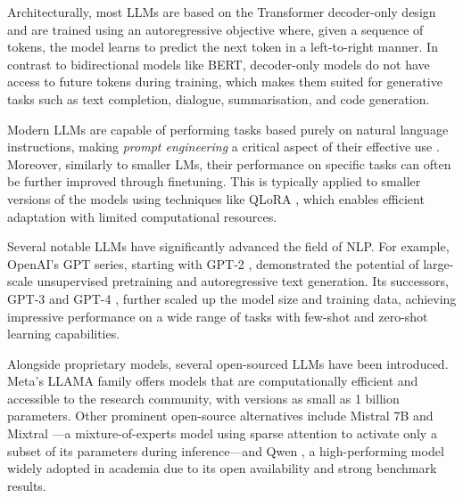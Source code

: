 Architecturally, most \acp{LLM} are based on the Transformer decoder-only design and are trained using an autoregressive objective \cite{GPT3}where, given a sequence of tokens, the model learns to predict the next token in a left-to-right manner. In contrast to bidirectional models like BERT, decoder-only models do not have access to future tokens during training, which makes them suited for generative tasks such as text completion, dialogue, summarisation, and code generation.

Modern \acp{LLM} are capable of performing tasks based purely on natural language instructions, making \textit{prompt engineering} a critical aspect of their effective use \cite{reynolds2021prompt}. %
Moreover, similarly to smaller \acp{LM}, their performance on specific tasks can often be further improved through finetuning. This is typically applied to smaller versions of the models using techniques like \ac{QLoRA} \cite{dettmers2023qlora}, which enables efficient adaptation with limited computational resources.

Several notable \acp{LLM} have significantly advanced the field of \ac{NLP}. For example, OpenAI's GPT series, starting with GPT-2 \cite{GPT2}, demonstrated the potential of large-scale unsupervised pretraining and autoregressive text generation. Its successors, GPT-3 \cite{GPT3} and GPT-4 \cite{achiam2023gpt}, further scaled up the model size and training data, achieving impressive performance on a wide range of tasks with few-shot and zero-shot learning capabilities. 

Alongside proprietary models, several open-sourced \acp{LLM} have been introduced. Meta's LLAMA family \cite{touvron2023llama,touvron2023llama2} offers models that are computationally efficient and accessible to the research community, with versions as small as 1 billion parameters. Other prominent open-source alternatives include Mistral 7B and Mixtral \cite{jiang2024mixtral}—a mixture-of-experts model using sparse attention to activate only a subset of its parameters during inference—and Qwen \cite{qwen}, a high-performing model widely adopted in academia due to its open availability and strong benchmark results.

